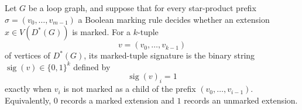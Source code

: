 \begin{definition}
Let \(G\) be a loop graph, and suppose that for every star-product prefix
\(\sigma=(v_0,\ldots,v_{m-1})\) a Boolean marking rule decides whether an
extension \(x\in V(D^*(G))\) is marked.  For a \(k\)-tuple
\[
  v=(v_0,\ldots,v_{k-1})
\]
of vertices of \(D^*(G)\), its marked-tuple signature is the binary string
\(\operatorname{sig}(v)\in\{0,1\}^k\) defined by
\[
  \operatorname{sig}(v)_i=1
\]
exactly when \(v_i\) is not marked as a child of the prefix
\((v_0,\ldots,v_{i-1})\).  Equivalently, \(0\) records a marked extension
and \(1\) records an unmarked extension.
\end{definition}
